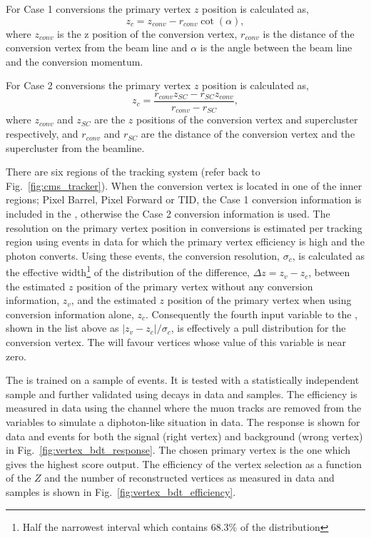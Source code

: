 For Case 1 conversions the primary vertex $z$ position is calculated as,
\begin{equation}
  z_{c} = z_{conv} - r_{conv}\cot(\alpha),
\end{equation}
where $z_{conv}$ is the z position of the conversion vertex, $r_{conv}$ is the distance of the conversion vertex from the beam line and $\alpha$ is the angle between the beam line and the conversion momentum.

For Case 2 conversions the primary vertex $z$ position is calculated as,
\begin{equation}
  z_{c} = \frac{r_{conv}z_{SC} - r_{SC}z_{conv}}{r_{conv} - r_{SC}},
\end{equation}
where $z_{conv}$ and $z_{SC}$ are the $z$ positions of the conversion vertex and supercluster respectively, and $r_{conv}$ and $r_{SC}$ are the distance of the conversion vertex and the supercluster from the beamline.

There are six regions of the tracking system (refer back to Fig.~\ref{fig:cms_tracker}). When the conversion vertex is located in one of the inner regions; Pixel Barrel, Pixel Forward or TID, the Case 1 
conversion information is included in the \BDT, otherwise the Case 2 conversion information is used. The resolution on the primary vertex position in conversions is estimated per tracking region using \gjet events in data for which the primary vertex efficiency is high and the photon converts. Using these events, the conversion resolution, $\sigma_{c}$, is calculated as the effective width\footnote{Half the narrowest interval which contains 68.3\% of the distribution} of the distribution of the difference, $\Delta z=z_{v}-z_{c}$, between the estimated $z$ position of the primary vertex without any conversion information, $z_{v}$, and the estimated $z$ position of the primary vertex when using conversion information alone, $z_{c}$. Consequently the fourth input variable to the \BDT, shown in the list above as $|z_{v}-z_{c}|/\sigma_{c}$, is effectively a pull distribution for the conversion vertex. The \BDT will favour vertices whose value of this variable is near zero.

The \BDT is trained on a sample of \Hgg \MC events. It is tested with a statistically independent sample and further validated using \Zmumu decays in data and \MC samples. The efficiency is measured in data using the \Zmumu channel where the muon tracks are removed from the \BDT variables to simulate a diphoton-like situation in data. The \BDT response is shown for \Zmumu data and \MC events for both the signal (right vertex) and background (wrong vertex) in Fig.~\ref{fig:vertex_bdt_response}. The chosen primary vertex is the one which gives the highest score \BDT output. The efficiency of the vertex selection as a function of the $Z$ \pT and the number of reconstructed vertices as measured in \Zmumu data and \MC samples is shown in Fig.~\ref{fig:vertex_bdt_efficiency}. 

